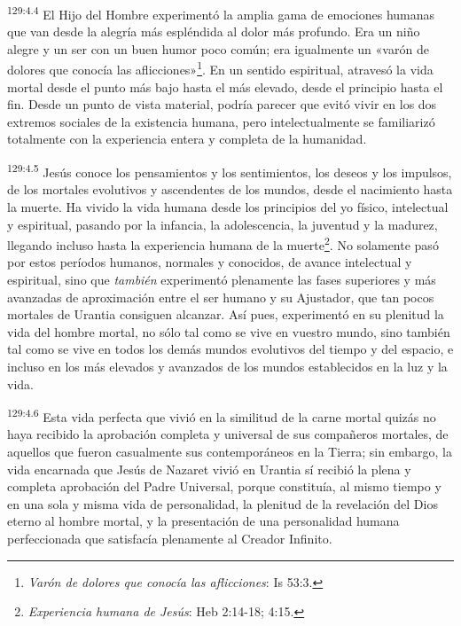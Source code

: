 \par
\textsuperscript{129:4.4} El Hijo del Hombre experimentó la amplia gama de emociones humanas que van desde la alegría más espléndida al dolor más profundo. Era un niño alegre y un ser con un buen humor poco común; era igualmente un «varón de dolores que conocía las aflicciones»\footnote{\textit{Varón de dolores que conocía las aflicciones}: Is 53:3.}. En un sentido espiritual, atravesó la vida mortal desde el punto más bajo hasta el más elevado, desde el principio hasta el fin. Desde un punto de vista material, podría parecer que evitó vivir en los dos extremos sociales de la existencia humana, pero intelectualmente se familiarizó totalmente con la experiencia entera y completa de la humanidad.

\par
\textsuperscript{129:4.5} Jesús conoce los pensamientos y los sentimientos, los deseos y los impulsos, de los mortales evolutivos y ascendentes de los mundos, desde el nacimiento hasta la muerte. Ha vivido la vida humana desde los principios del yo físico, intelectual y espiritual, pasando por la infancia, la adolescencia, la juventud y la madurez, llegando incluso hasta la experiencia humana de la muerte\footnote{\textit{Experiencia humana de Jesús}: Heb 2:14-18; 4:15.}. No solamente pasó por estos períodos humanos, normales y conocidos, de avance intelectual y espiritual, sino que \textit{también} experimentó plenamente las fases superiores y más avanzadas de aproximación entre el ser humano y su Ajustador, que tan pocos mortales de Urantia consiguen alcanzar. Así pues, experimentó en su plenitud la vida del hombre mortal, no sólo tal como se vive en vuestro mundo, sino también tal como se vive en todos los demás mundos evolutivos del tiempo y del espacio, e incluso en los más elevados y avanzados de los mundos establecidos en la luz y la vida.

\par
\textsuperscript{129:4.6} Esta vida perfecta que vivió en la similitud de la carne mortal quizás no haya recibido la aprobación completa y universal de sus compañeros mortales, de aquellos que fueron casualmente sus contemporáneos en la Tierra; sin embargo, la vida encarnada que Jesús de Nazaret vivió en Urantia sí recibió la plena y completa aprobación del Padre Universal, porque constituía, al mismo tiempo y en una sola y misma vida de personalidad, la plenitud de la revelación del Dios eterno al hombre mortal, y la presentación de una personalidad humana perfeccionada que satisfacía plenamente al Creador Infinito.


